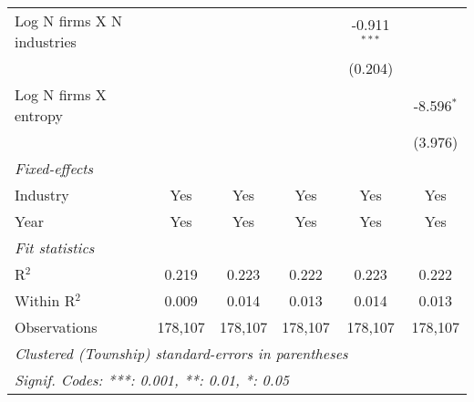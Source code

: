 \begin{tabular}{lccccc}
   Log N firms X N industries           &                 &                 &                 & -0.911$^{***}$  &   \\   
                                        &                 &                 &                 & (0.204)         &   \\   
   Log N firms X entropy                &                 &                 &                 &                 & -8.596$^{*}$\\   
                                        &                 &                 &                 &                 & (3.976)\\   
   \midrule
   \emph{Fixed-effects}\\
   Industry                             & Yes             & Yes             & Yes             & Yes             & Yes\\  
   Year                                 & Yes             & Yes             & Yes             & Yes             & Yes\\  
   \midrule
   \emph{Fit statistics}\\
   R$^2$                                & 0.219           & 0.223           & 0.222           & 0.223           & 0.222\\  
   Within R$^2$                         & 0.009           & 0.014           & 0.013           & 0.014           & 0.013\\  
   Observations                         & 178,107         & 178,107         & 178,107         & 178,107         & 178,107\\  
   \midrule \midrule
   \multicolumn{6}{l}{\emph{Clustered (Township) standard-errors in parentheses}}\\
   \multicolumn{6}{l}{\emph{Signif. Codes: ***: 0.001, **: 0.01, *: 0.05}}\\
\end{tabular}
\par\endgroup
